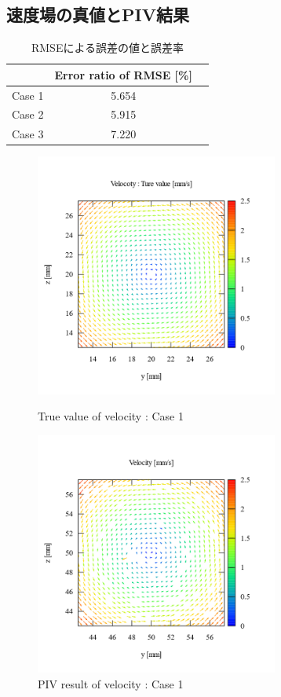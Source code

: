 \documentclass[twocolumn,a4j]{jsarticle}
\begin{document}
\subsection{速度場の真値とPIV結果}

\begin{table}[hbtp]
  \label{table:data_type}
  \caption{RMSEによる誤差の値と誤差率}
  \centering
  \begin{tabular}{ c c c }
    \hline
           & Error ratio of RMSE [\%] \\ \hline \hline
    Case 1 & 5.654                    \\ \hline
    Case 2 & 5.915                    \\ \hline
    Case 3 & 7.220                    \\ \hline
  \end{tabular}
\end{table}


\begin{figure}[htbp]
  \footnotesize
  \begin{center}
    \includegraphics[width=80mm]{../images/vector_true_value.png}
    \caption{True value of velocity : Case 1}
    \includegraphics[width=80mm]{../images/vector_simulation.png}
    \caption{PIV result of velocity : Case 1}
  \end{center}
\end{figure}
\end{document}
